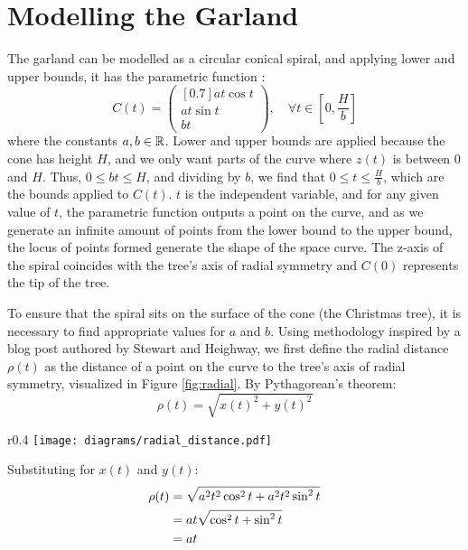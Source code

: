 \section*{Modelling the Garland}

The garland can be modelled as a circular conical spiral, and applying lower and upper bounds, it has the parametric function \autocite{rejbrandConicalHelix}:
\begin{equation}
    C(t) = \begin{pmatrix}[0.7]
        at\cos{t} \\
        at\sin{t} \\
        bt
    \end{pmatrix}, \quad \forall t \in \left[0, \frac{H}{b}\right]
\end{equation}
where the constants $a, b \in \mathbb{R}$. Lower and upper bounds are applied because the cone has height $H$, and we only want parts of the curve where $z(t)$ is between $0$ and $H$. Thus, $0 \leq bt \leq H$, and dividing by $b$, we find that $0 \leq t \leq \frac{H}{b}$, which are the bounds applied to $C(t)$. $t$ is the independent variable, and for any given value of $t$, the parametric function outputs a point on the curve, and as we generate an infinite
amount of points from the lower bound to the upper bound, the locus of points formed generate the shape of the space curve. The z-axis of the spiral coincides with the tree's axis of radial symmetry and $C(0)$ represents the tip of the tree.

To ensure that the spiral sits on the surface of the cone (the Christmas tree), it is necessary to find appropriate values for $a$ and $b$. Using methodology inspired by a blog post authored by Stewart and Heighway, we first define the radial distance $\rho(t)$ as the distance of a point on the curve to the tree's axis of radial symmetry, visualized in Figure \ref{fig:radial}. By Pythagorean's theorem:
\begin{equation*}
    \rho(t) = \sqrt{x(t)^2+y(t)^2}
\end{equation*}
\begin{wrapfigure}{r}{0.4\textwidth}
    \centering
    \texttt{[image: diagrams/radial\_distance.pdf]}
    \caption{Radial distance of a point on the spiral to the z-axis (top-down view).} \label{fig:radial}
    \vspace*{-30pt}
\end{wrapfigure}
\bulletarrow Substituting for $x(t)$ and $y(t)$:
\begin{align}
    \rho(t) & = \sqrt{a^2t^2\cos^2{t}+a^2t^2\sin^2{t}} \notag \\
            & = at\sqrt{\cos^2{t}+\sin^2{t}} \notag           \\
            & = at
\end{align}


